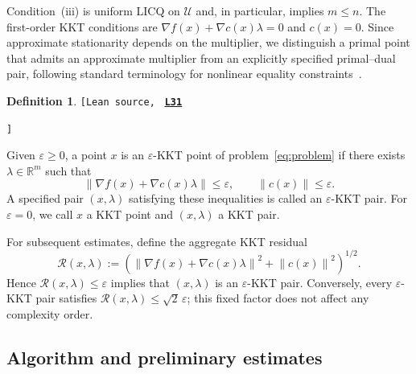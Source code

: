 \documentclass[11pt]{article}
\theoremstyle{definition}
\newtheorem{definition}[theorem]{Definition}
\theoremstyle{remark}
\numberwithin{equation}{section}
\numberwithin{figure}{section}
\numberwithin{table}{section}
\numberwithin{algorithm}{section}
\newcommand{\norm}[1]{\left\lVert #1\right\rVert}
\newcommand{\grad}{\nabla}
\newcommand{\leanLinkText}[1]{%
  \underline{\textbf{#1}}%
}
\newcommand{\leanDeclTag}[2]{%
  {\footnotesize\texttt{[Lean source, }}%
  \href{https://github.com/optpku/ReasBook/blob/v4.32.2/ReasBook/Papers/TR_LALM_theory/#1?plain=1\#L#2}%
    {\leanLinkText{\footnotesize\texttt{L#2}}}%
}
\newcommand{\leanDeclTagEnd}{%
  \unskip
  {\footnotesize\texttt{]}}\enspace
}
\begin{document}
Condition~(iii) is uniform LICQ on $\mathcal U$ and, in particular,
implies $m\le n$. The first-order KKT conditions are \(\grad f(x)+\grad c(x)\lambda=0\) and \(c(x)=0\). Since approximate stationarity depends on the multiplier, we distinguish
a primal point that admits an approximate multiplier from an explicitly specified primal--dual pair, following standard terminology for nonlinear equality constraints~\cite{XieWright2021,BourkhissiNecoara2025}.

\begin{definition}
\label{def:eps-kkt}
\leanDeclTag{Definition_2_2/KKT.lean}{31}
\leanDeclTagEnd
Given \(\varepsilon\ge0\), a point \(x\) is an
\(\varepsilon\)-KKT point of problem~\eqref{eq:problem} if there exists
\(\lambda\in\mathbb{R}^m\) such that
$$
\norm{\grad f(x)+\grad c(x)\lambda}\le\varepsilon,
\qquad
\norm{c(x)}\le\varepsilon.
$$
A specified pair \((x,\lambda)\) satisfying these inequalities is called
an \(\varepsilon\)-KKT pair.  For \(\varepsilon=0\), we call \(x\) a
KKT point and \((x,\lambda)\) a KKT pair.
\end{definition}

For subsequent estimates, define the aggregate KKT residual
\begin{equation}
    \mathcal R(x,\lambda)
    :=\left(\norm{\grad f(x)+\grad c(x)\lambda}^2
       +\norm{c(x)}^2\right)^{1/2}.
    \label{eq:kkt-residual}
\end{equation}
Hence \(\mathcal R(x,\lambda)\le\varepsilon\) implies that
\((x,\lambda)\) is an \(\varepsilon\)-KKT pair.  Conversely, every
\(\varepsilon\)-KKT pair satisfies
\(\mathcal R(x,\lambda)\le\sqrt{2}\,\varepsilon\); this fixed factor does not
affect any complexity order.
\subsection{Algorithm and preliminary estimates}
\label{sec:method}
\end{document}
